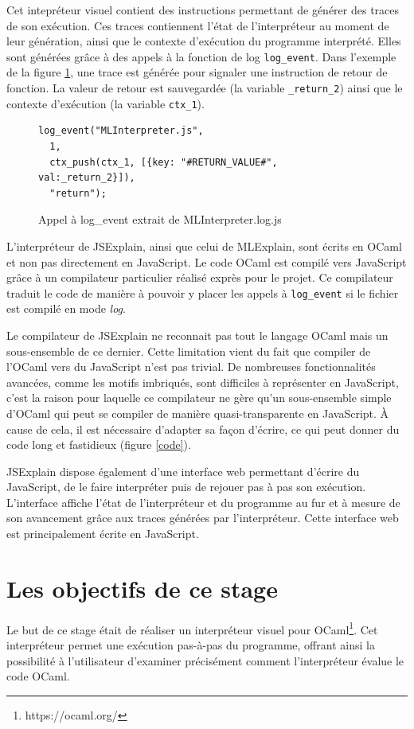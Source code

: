 \documentclass[a4paper,10pt]{article}
\begin{document}
Cet intepréteur visuel contient des instructions permettant de générer des 
traces de son exécution. Ces traces contiennent l'état de l'interpréteur au 
moment de leur génération, ainsi que le contexte d'exécution du programme 
interprété. Elles sont générées grâce à des appels à la fonction de log 
\verb|log_event|. Dans l'exemple de la figure \ref{log_event}, une trace est 
générée pour signaler une instruction de retour de fonction. La valeur de retour 
est sauvegardée (la variable \verb|_return_2|) ainsi que le contexte 
d'exécution (la variable \verb|ctx_1|).

\begin{figure}[ht]
\begin{lstlisting}
log_event("MLInterpreter.js",
  1,
  ctx_push(ctx_1, [{key: "#RETURN_VALUE#", val:_return_2}]),
  "return");
\end{lstlisting}
\caption{Appel à log\_event extrait de MLInterpreter.log.js}
\label{log_event}
\end{figure}

L'interpréteur de JSExplain, ainsi que celui de MLExplain, sont écrits en OCaml 
et non pas directement en JavaScript. Le code OCaml est compilé vers JavaScript 
grâce à un compilateur particulier réalisé exprès pour le projet. Ce compilateur 
traduit le code de manière à pouvoir y placer les appels à \verb|log_event| si 
le fichier est compilé en mode \emph{log}.

Le compilateur de JSExplain ne reconnait pas tout le langage OCaml mais un 
sous-ensemble de ce dernier. Cette limitation vient du fait que compiler de 
l'OCaml vers du JavaScript n'est pas trivial. De nombreuses fonctionnalités 
avancées, comme les motifs imbriqués, sont difficiles à représenter en 
JavaScript, c'est la raison pour laquelle ce compilateur ne gère qu'un 
sous-ensemble simple d'OCaml qui peut se compiler de manière quasi-transparente 
en JavaScript. À cause de cela, il est nécessaire d'adapter sa façon d'écrire, 
ce qui peut donner du code long et fastidieux (figure \ref{code}).

JSExplain dispose également d'une interface web permettant d'écrire du 
JavaScript, de le faire interpréter puis de rejouer pas à pas son exécution. 
L'interface affiche l'état de l'interpréteur et du programme au fur et à mesure 
de son avancement grâce aux traces générées par l'interpréteur. Cette interface 
web est principalement écrite en JavaScript.

\section{Les objectifs de ce stage}
Le but de ce stage était de réaliser un interpréteur visuel pour 
OCaml\footnote{https://ocaml.org/}. Cet interpréteur permet une exécution 
pas-à-pas du programme, offrant ainsi la possibilité à l'utilisateur d'examiner 
précisément comment l'interpréteur évalue le code OCaml.
\end{document}

